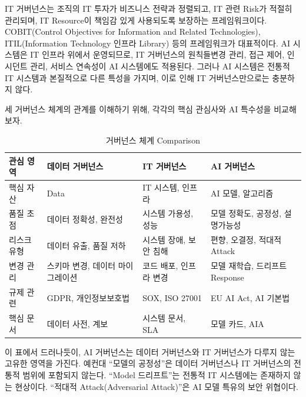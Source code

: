 IT 거버넌스는 조직의 IT 투자가 비즈니스 전략과 정렬되고, IT 관련 Risk가 적절히 관리되며, IT Resource이 책임감 있게 사용되도록 보장하는 프레임워크이다. COBIT(Control Objectives for Information and Related Technologies), ITIL(Information Technology 인프라 Library) 등의 프레임워크가 대표적이다. AI 시스템은 IT 인프라 위에서 운영되므로, IT 거버넌스의 원칙들변경 관리, 접근 제어, 인시던트 관리, 서비스 연속성이 AI 시스템에도 적용된다. 그러나 AI 시스템은 전통적 IT 시스템과 본질적으로 다른 특성을 가지며, 이로 인해 IT 거버넌스만으로는 충분하지 않다.

세 거버넌스 체계의 관계를 이해하기 위해, 각각의 핵심 관심사와 AI 특수성을 비교해 보자.

\begin{table}[h]
\centering
\begin{tabular}{|l|p{3.5cm}|p{3.5cm}|p{3.5cm}|}
\hline
\textbf{관심 영역} & \textbf{데이터 거버넌스} & \textbf{IT 거버넌스} & \textbf{AI 거버넌스} \\ \hline
핵심 자산 & Data & IT 시스템, 인프라 & AI 모델, 알고리즘 \\ \hline
품질 초점 & 데이터 정확성, 완전성 & 시스템 가용성, 성능 & 모델 정확도, 공정성, 설명가능성 \\ \hline
리스크 유형 & 데이터 유출, 품질 저하 & 시스템 장애, 보안 침해 & 편향, 오결정, 적대적 Attack \\ \hline
변경 관리 & 스키마 변경, 데이터 마이그레이션 & 코드 배포, 인프라 변경 & 모델 재학습, 드리프트 Response \\ \hline
규제 관련 & GDPR, 개인정보보호법 & SOX, ISO 27001 & EU AI Act, AI 기본법 \\ \hline
핵심 문서 & 데이터 사전, 계보 & 시스템 문서, SLA & 모델 카드, AIA \\ \hline
\end{tabular}
\caption{거버넌스 체계 Comparison}
\end{table}

이 표에서 드러나듯이, AI 거버넌스는 데이터 거버넌스와 IT 거버넌스가 다루지 않는 고유한 영역을 가진다. 예컨대 ``모델의 공정성''은 데이터 거버넌스나 IT 거버넌스의 전통적 범위에 포함되지 않는다. ``Model 드리프트''는 전통적 IT 시스템에는 존재하지 않는 현상이다. ``적대적 Attack(Adversarial Attack)''은 AI 모델 특유의 보안 위협이다.

